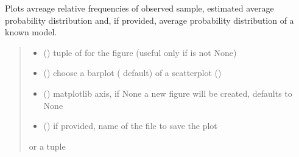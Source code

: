 \documentclass[letterpaper,10pt,english]{sphinxmanual}
\begin{document}
\begin{fulllineitems}
\begin{fulllineitems}
\label{\detokenize{cubmods:cubmods.cush_x.CUBresCUSHX.plot_ordinal}}
\pysigstartsignatures
{}
\pysigstopsignatures
\sphinxAtStartPar
Plots avreage relative frequencies of observed sample, estimated 
average probability distribution and,
if provided, average probability distribution of a known model.
\begin{quote}\begin{description}
\begin{itemize}
\item {} 
\sphinxAtStartPar
{} () \textendash{} tuple of  for the figure (useful only if  is not None)

\item {} 
\sphinxAtStartPar
{} () \textendash{} choose a barplot ( default) of a scatterplot ()

\item {} 
\sphinxAtStartPar
{} (\sphinxstyleliteralemphasis{\sphinxupquote{, }}) \textendash{} matplotlib axis, if None a new figure will be created, defaults to None

\item {} 
\sphinxAtStartPar
{} () \textendash{} if provided, name of the file to save the plot

\end{itemize}

\sphinxAtStartPar
{} or a tuple 

\end{description}\end{quote}

\end{fulllineitems}


\end{fulllineitems}
\end{document}
